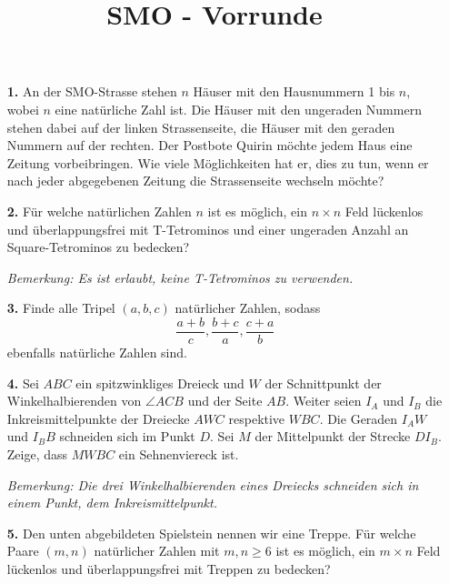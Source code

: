 \documentclass[language=german,style=exam]{smo}
\title{SMO - Vorrunde}
\begin{document}
\begin{enumerate}

\item[\textbf{1.}] 
An der SMO-Strasse stehen $n$ Häuser mit den Hausnummern 1 bis $n$, wobei $n$ eine natürliche Zahl ist. Die Häuser mit den ungeraden Nummern stehen dabei auf der linken Strassenseite, die Häuser mit den geraden Nummern auf der rechten. Der Postbote Quirin möchte jedem Haus eine Zeitung vorbeibringen. Wie viele Möglichkeiten hat er, dies zu tun, wenn er nach jeder abgegebenen Zeitung die Strassenseite wechseln möchte?

\bigskip

\item[\textbf{2.}] 
Für welche natürlichen Zahlen $n$ ist es möglich, ein $n\times n$ Feld lückenlos und überlappungsfrei mit T-Tetrominos und einer ungeraden Anzahl an Square-Tetrominos zu bedecken?
\vspace{-0cm}
\begin{center}
\quad
{}
\end{center}
\textit{Bemerkung: Es ist erlaubt, keine T-Tetrominos zu verwenden.}
\vspace{0.2cm}
\item[\textbf{3.}]
Finde alle Tripel $(a,b,c)$ natürlicher Zahlen, sodass
\[
\frac{a+b}{c},\frac{b+c}{a},\frac{c+a}{b}
\]
ebenfalls natürliche Zahlen sind.

\bigskip

\item[\textbf{4.}] 
Sei $ABC$ ein spitzwinkliges Dreieck und $W$ der Schnittpunkt der Winkelhalbierenden von $\angle ACB$ und der Seite $AB$. Weiter seien $I_A$ und $I_B$ die Inkreismittelpunkte der Dreiecke $AWC$ respektive $WBC$. Die Geraden $I_AW$ und $I_BB$ schneiden sich im Punkt $D$. Sei $M$ der Mittelpunkt der Strecke $DI_B$.
Zeige, dass $MWBC$ ein Sehnenviereck ist.

\textit{Bemerkung: Die drei Winkelhalbierenden eines Dreiecks schneiden sich in einem Punkt, dem Inkreismittelpunkt.}

\bigskip

\item[\textbf{5.}] 
Den unten abgebildeten Spielstein nennen wir eine Treppe. Für welche Paare $(m,n)$ natürlicher Zahlen mit $m,n\geq 6$ ist es möglich, ein $m\times n$ Feld lückenlos und überlappungsfrei mit Treppen zu bedecken?
\vspace{-0cm}
\begin{center}


\end{center}
\end{enumerate}
\end{document}

